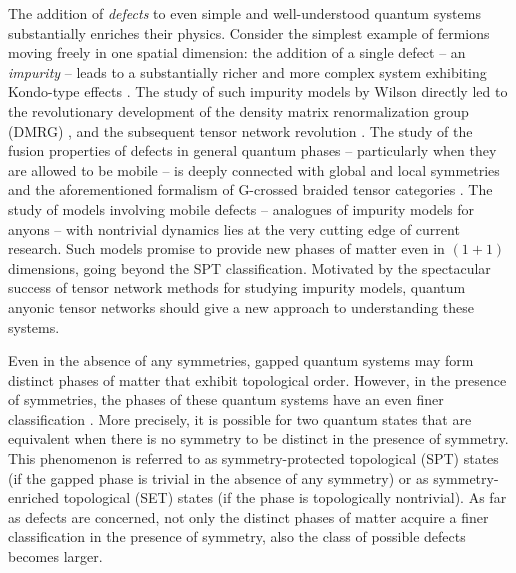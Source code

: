 The addition of \emph{defects} to even simple and well-understood quantum systems substantially enriches their physics. Consider the simplest example of fermions moving freely in one spatial dimension: the addition of a single defect -- an \emph{impurity} -- leads to a substantially richer and more complex system exhibiting Kondo-type effects \cite{andersonLocalizedMagneticStates1961,hewsonKondoProblemHeavy1997}. The study of such impurity models by Wilson \cite{wilsonRenormalizationGroupCritical1975} directly led to the revolutionary development of the density matrix renormalization group (DMRG) \cite{whiteDensityMatrixFormulation1992}, and the subsequent tensor network revolution \cite{bridgemanHandwavingInterpretiveDance2017}. The study of the fusion properties of defects in general quantum phases -- particularly when they are allowed to be mobile -- is deeply connected with global and local symmetries and the aforementioned formalism of G-crossed braided tensor categories \cite{BJQ13b}. The study of models involving mobile defects -- analogues of impurity models for anyons -- with nontrivial dynamics lies at the very cutting edge of current research. Such models promise to provide new phases of matter even in $(1+1)$ dimensions, going beyond the SPT classification. Motivated by the spectacular success of tensor network methods for studying impurity models, quantum anyonic tensor networks should give a new approach to understanding these systems.

Even in the absence of any symmetries, gapped quantum systems may form distinct phases of matter that exhibit topological order. However, in the presence of symmetries, the phases of these quantum systems have an even finer classification \cite{Wen2002,SRFL08,Kitaev2009,FK10,CGW11,FK11,TPB11,LS12,LV12,FM13,EH13,NCMT14,WPS14,K14,F14,EN14,MFCV15,BRSX15,LV16}. More precisely, it is possible for two quantum states that are equivalent when there is no symmetry to be distinct in the presence of symmetry. This phenomenon is referred to as symmetry-protected topological (SPT) states \cite{CGLW13,Yoshida2015,Yoshida2017} (if the gapped phase is trivial in the absence of any symmetry) or as symmetry-enriched topological (SET) states \cite{ENO10,MR13,WBV17} (if the phase is topologically nontrivial). As far as defects are concerned, not only the distinct phases of matter acquire a finer classification in the presence of symmetry, also the class of possible defects becomes larger. 

